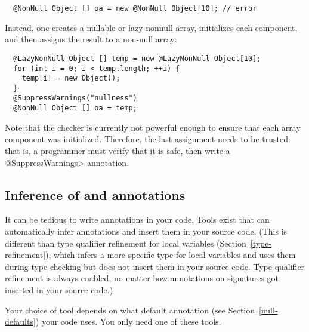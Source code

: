 \begin{Verbatim}
  @NonNull Object [] oa = new @NonNull Object[10]; // error
\end{Verbatim}

Instead, one creates a nullable or lazy-nonnull array, initializes
each component, and then assigns the result to a non-null array:

\begin{Verbatim}
  @LazyNonNull Object [] temp = new @LazyNonNull Object[10];
  for (int i = 0; i < temp.length; ++i) {
    temp[i] = new Object();
  }
  @SuppressWarnings("nullness")
  @NonNull Object [] oa = temp;
\end{Verbatim}

Note that the checker is currently not powerful enough to ensure that
each array component was initialized. Therefore, the last assignment
needs to be trusted:  that is, a programmer must verify that it is safe,
then write a \<@SuppressWarnings> annotation.



\subsection{Inference of  and  annotations\label{nullness-inference}}

It can be tedious to write annotations in your code.  Tools exist that
can automatically infer annotations and insert them in your source code.
(This is different than type qualifier refinement for local variables
(Section~\ref{type-refinement}), which infers a more specific type for
local variables and uses them during type-checking but does not insert them
in your source code.  Type qualifier refinement is always enabled, no
matter how annotations on signatures got inserted in your source code.)

Your choice of tool depends on what default annotation (see
Section~\ref{null-defaults}) your code uses.  You only need one of these tools.

